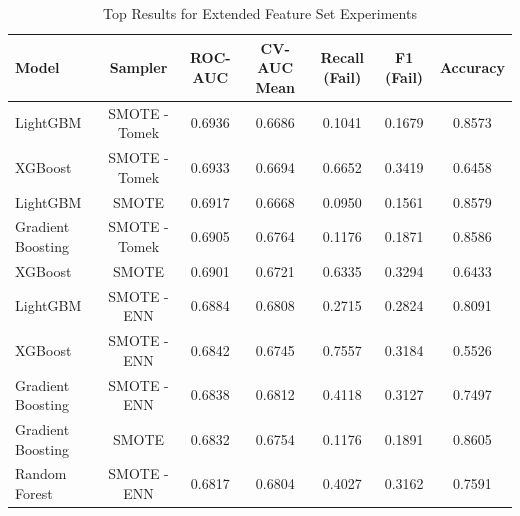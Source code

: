 \begin{table}[htbp]
\caption{Top Results for Extended Feature Set Experiments}
\label{tab:extended_results}
\begin{tabular}{lcccccc}
\toprule

Model & Sampler & ROC-AUC & CV-AUC Mean & Recall (Fail) & F1 (Fail) & Accuracy \\
\midrule

LightGBM & SMOTE - Tomek & 0.6936 & 0.6686 & 0.1041 & 0.1679 & 0.8573 \\
XGBoost & SMOTE - Tomek & 0.6933 & 0.6694 & 0.6652 & 0.3419 & 0.6458 \\
LightGBM & SMOTE & 0.6917 & 0.6668 & 0.0950 & 0.1561 & 0.8579 \\
Gradient Boosting & SMOTE - Tomek & 0.6905 & 0.6764 & 0.1176 & 0.1871 & 0.8586 \\
XGBoost & SMOTE & 0.6901 & 0.6721 & 0.6335 & 0.3294 & 0.6433 \\
LightGBM & SMOTE - ENN & 0.6884 & 0.6808 & 0.2715 & 0.2824 & 0.8091 \\
XGBoost & SMOTE - ENN & 0.6842 & 0.6745 & 0.7557 & 0.3184 & 0.5526 \\
Gradient Boosting & SMOTE - ENN & 0.6838 & 0.6812 & 0.4118 & 0.3127 & 0.7497 \\
Gradient Boosting & SMOTE & 0.6832 & 0.6754 & 0.1176 & 0.1891 & 0.8605 \\
Random Forest & SMOTE - ENN & 0.6817 & 0.6804 & 0.4027 & 0.3162 & 0.7591 \\
\bottomrule

\end{tabular}
\end{table}
